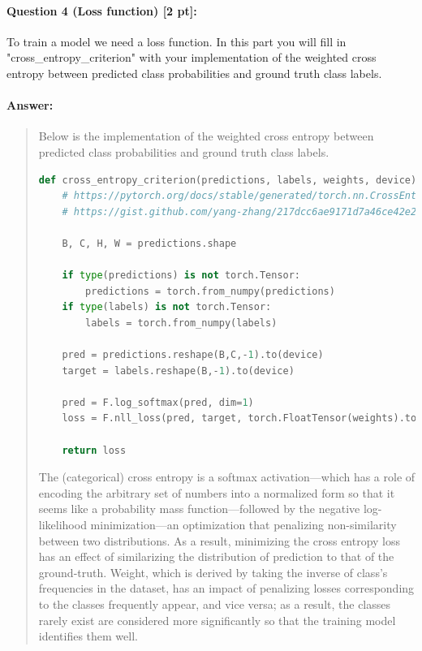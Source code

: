 \documentclass[9pt]{article}
\begin{document}
\paragraph{Question 4 (Loss function) [2 pt]:} 
To train a model we need a loss function. In this part you will fill in "cross\_entropy\_criterion" with your implementation of the weighted cross entropy between predicted class probabilities and ground truth class labels.
\paragraph{Answer:} 
\begin{quote}

Below is the implementation of the weighted cross entropy between predicted class probabilities and ground truth class labels.

\begin{lstlisting}[language=Python, basicstyle=\scriptsize]
def cross_entropy_criterion(predictions, labels, weights, device):
    # https://pytorch.org/docs/stable/generated/torch.nn.CrossEntropyLoss.html#torch.nn.CrossEntropyLoss
    # https://gist.github.com/yang-zhang/217dcc6ae9171d7a46ce42e215c1fee0
    
    B, C, H, W = predictions.shape

    if type(predictions) is not torch.Tensor:
        predictions = torch.from_numpy(predictions)
    if type(labels) is not torch.Tensor:
        labels = torch.from_numpy(labels)

    pred = predictions.reshape(B,C,-1).to(device)
    target = labels.reshape(B,-1).to(device)

    pred = F.log_softmax(pred, dim=1)
    loss = F.nll_loss(pred, target, torch.FloatTensor(weights).to(device))

    return loss
\end{lstlisting}

The (categorical) cross entropy is a softmax activation---which has a role of encoding the arbitrary set of numbers into a normalized form so that it seems like a probability mass function---followed by the negative log-likelihood minimization---an optimization that penalizing non-similarity between two distributions. As a result, minimizing the cross entropy loss has an effect of similarizing the distribution of prediction to that of the ground-truth. Weight, which is derived by taking the inverse of class's frequencies in the dataset, has an impact of penalizing losses corresponding to the classes frequently appear, and vice versa; as a result, the classes rarely exist are considered more significantly so that the training model identifies them well.

\end{quote}
\end{document}
